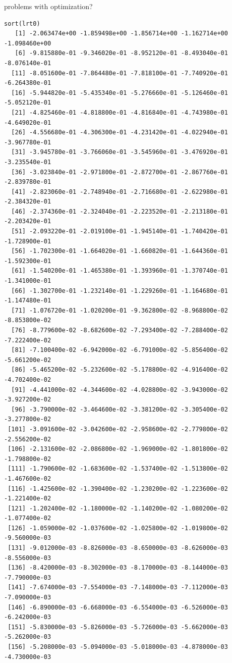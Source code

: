 \documentclass[12pt,letterpaper]{article}\usepackage[]{graphicx}\usepackage[]{color}
\begin{document}
\clearpage

problems with optimization?
\begin{lstlisting}
sort(lrt0)
   [1] -2.063474e+00 -1.859498e+00 -1.856714e+00 -1.162714e+00 -1.098460e+00
   [6] -9.815880e-01 -9.346020e-01 -8.952120e-01 -8.493040e-01 -8.076140e-01
  [11] -8.051600e-01 -7.864480e-01 -7.818100e-01 -7.740920e-01 -6.264380e-01
  [16] -5.944820e-01 -5.435340e-01 -5.276660e-01 -5.126460e-01 -5.052120e-01
  [21] -4.825460e-01 -4.818800e-01 -4.816840e-01 -4.743980e-01 -4.649020e-01
  [26] -4.556680e-01 -4.306300e-01 -4.231420e-01 -4.022940e-01 -3.967780e-01
  [31] -3.945780e-01 -3.766060e-01 -3.545960e-01 -3.476920e-01 -3.235540e-01
  [36] -3.023840e-01 -2.971800e-01 -2.872700e-01 -2.867760e-01 -2.839780e-01
  [41] -2.823060e-01 -2.748940e-01 -2.716680e-01 -2.622980e-01 -2.384320e-01
  [46] -2.374360e-01 -2.324040e-01 -2.223520e-01 -2.213180e-01 -2.203420e-01
  [51] -2.093220e-01 -2.019100e-01 -1.945140e-01 -1.740420e-01 -1.728900e-01
  [56] -1.702300e-01 -1.664020e-01 -1.660820e-01 -1.644360e-01 -1.592300e-01
  [61] -1.540200e-01 -1.465380e-01 -1.393960e-01 -1.370740e-01 -1.341000e-01
  [66] -1.302700e-01 -1.232140e-01 -1.229260e-01 -1.164680e-01 -1.147480e-01
  [71] -1.076720e-01 -1.020200e-01 -9.362800e-02 -8.968800e-02 -8.853800e-02
  [76] -8.779600e-02 -8.682600e-02 -7.293400e-02 -7.288400e-02 -7.222400e-02
  [81] -7.100400e-02 -6.942000e-02 -6.791000e-02 -5.856400e-02 -5.661200e-02
  [86] -5.465200e-02 -5.232600e-02 -5.178800e-02 -4.916400e-02 -4.702400e-02
  [91] -4.441000e-02 -4.344600e-02 -4.028800e-02 -3.943000e-02 -3.927200e-02
  [96] -3.790000e-02 -3.464600e-02 -3.381200e-02 -3.305400e-02 -3.277800e-02
 [101] -3.091600e-02 -3.042600e-02 -2.958600e-02 -2.779800e-02 -2.556200e-02
 [106] -2.131600e-02 -2.086800e-02 -1.969000e-02 -1.801800e-02 -1.798800e-02
 [111] -1.790600e-02 -1.683600e-02 -1.537400e-02 -1.513800e-02 -1.467600e-02
 [116] -1.425600e-02 -1.390400e-02 -1.230200e-02 -1.223600e-02 -1.221400e-02
 [121] -1.202400e-02 -1.180000e-02 -1.140200e-02 -1.080200e-02 -1.077400e-02
 [126] -1.059000e-02 -1.037600e-02 -1.025800e-02 -1.019800e-02 -9.560000e-03
 [131] -9.012000e-03 -8.826000e-03 -8.650000e-03 -8.626000e-03 -8.556000e-03
 [136] -8.420000e-03 -8.302000e-03 -8.170000e-03 -8.144000e-03 -7.790000e-03
 [141] -7.674000e-03 -7.554000e-03 -7.148000e-03 -7.112000e-03 -7.090000e-03
 [146] -6.890000e-03 -6.668000e-03 -6.554000e-03 -6.526000e-03 -6.242000e-03
 [151] -5.830000e-03 -5.826000e-03 -5.726000e-03 -5.662000e-03 -5.262000e-03
 [156] -5.208000e-03 -5.094000e-03 -5.018000e-03 -4.878000e-03 -4.730000e-03

\end{lstlisting}
\end{document}

